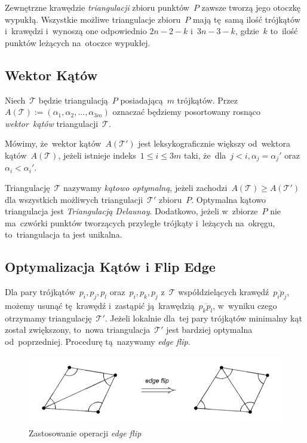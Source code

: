 \documentclass[skorowidz,autorrok,backref,xodstep,oswiadczenie]{wmimgr}
\begin{document}
Zewnętrzne krawędzie \emph{triangulacji} zbioru punktów~$P$ zawsze tworzą jego otoczkę wypukłą. Wszystkie możliwe triangulacje zbioru~$P$ mają tę~samą ilość trójkątów i~krawędzi i~wynoszą one odpowiednio $2n-2-k$ i~$3n-3-k$, gdzie~$k$ to~ilość punktów leżących na~otoczce wypukłej.

\subsection{Wektor Kątów}

Niech~$\mathcal{T}$ będzie triangulacją~$P$ posiadającą~$m$ trójkątów. Przez~$A(\mathcal{T}) := (\alpha_{1}, \alpha_{2}, ..., \alpha_{3m})$ oznaczać będziemy posortowany rosnąco \emph{wektor~kątów} triangulacji~$\mathcal{T}$.

Mówimy, że~wektor kątów~$A(\mathcal{T'})$ jest leksykograficznie większy od~wektora kątów~$A(\mathcal{T})$, jeżeli istnieje indeks~$1 \leq i \leq 3m$ taki, że~dla~$j < i, \alpha_{j} = \alpha_{j}'$ oraz~$\alpha_{i} < \alpha_{i}'$.

Triangulację~$\mathcal{T}$ nazywamy \emph{kątowo optymalną}, jeżeli zachodzi~$A(\mathcal{T}) \geq A(\mathcal{T'})$ dla wszystkich możliwych triangulacji~$\mathcal{T'}$ zbioru~$P$. Optymalna kątowo triangulacja jest \emph{Triangulacją Delaunay}. Dodatkowo, jeżeli w~zbiorze~$P$ nie ma~czwórki punktów tworzących przyległe trójkąty i~leżących na~okręgu, to~triangulacja ta jest unikalna.

\subsection{Optymalizacja Kątów i Flip Edge}

Dla pary trójkątów~$p_{i}, p_{j}, p_{l}$ oraz~$p_{i}, p_{k}, p_{j}$ z~$\mathcal{T}$ współdzielących krawędź~$\overline{p_{i} p_{j}}$, możemy usunąć tę~krawędź i~zastąpić ją~krawędzią~$\overline{p_{k} p_{l}}$, w~wyniku czego otrzymamy triangulację~$\mathcal{T'}$. Jeżeli lokalnie dla~tej pary trójkątów minimalny kąt został zwiększony, to~nowa triangulacja~$\mathcal{T'}$ jest bardziej optymalna od~poprzedniej. Procedurę tą~nazywamy \emph{edge flip}.

\begin{figure}[ht!]
\centering
\includegraphics[width=150mm]{images/triangulacja2.png}
\caption{Zastosowanie operacji \emph{edge flip}}
\label{edgeflip}
\end{figure}
\end{document}
